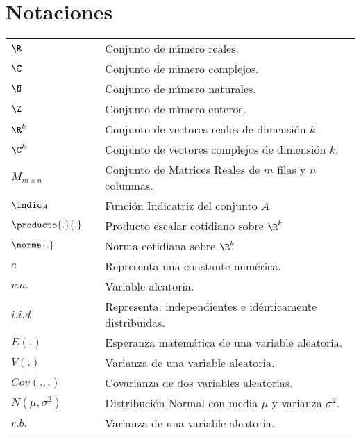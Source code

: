 \chapter*{Notaciones}

\begin{tabular}{lcl}
	\(\R \)		&&	Conjunto de número reales. \\
	\(\C \)		&&	Conjunto de número complejos. \\
	\(\N \)		&&	Conjunto de número naturales. \\
	\(\Z \)		&&	Conjunto de número enteros. \\
	\(\R^k \)	&&	Conjunto de vectores reales de dimensión $k$. \\
	\(\C^k \)	&&	Conjunto de vectores complejos de dimensión $k$. \\
	\(M_{m\times n}\)  &&	Conjunto de Matrices Reales de $m$ filas y $n$ columnas. \\
	\( \indic_A \)	&&	Función Indicatriz del conjunto $A$ \\
	\( \producto{.}{.}\)	&&	Producto escalar cotidiano sobre $\R^k $ \\
	\( \norma{.} \)	&&	Norma cotidiana sobre $\R^k $ \\
	\(c\)		&&	Representa una constante numérica. \\
	\(v.a.\)		&&	Variable aleatoria. \\			
	\(i.i.d \)	&&	Representa: independientes e idénticamente distribuidas. \\

	\(E(.)\)	&& 	Esperanza matemática de una variable aleatoria. \\
	\(V(.) \)	&&	Varianza de una variable aleatoria. \\
	\(Cov(.,.)\)	&& 	Covarianza de dos variables aleatorias. \\
	\(N(\mu,\sigma^2)\)		&&	Distribución Normal con media $\mu$ y varianza $\sigma^2$. \\
	\(r.b. \)	&&	Varianza de una variable aleatoria. \\

  	
\end{tabular}